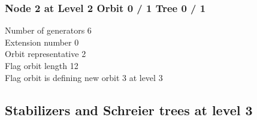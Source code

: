 \subsubsection*{Node 2 at Level 2 Orbit 0 / 1 Tree 0 / 1}
Number of generators 6\\

\noindent Extension number 0\\
Orbit representative 2\\
Flag orbit length 12\\
Flag orbit is defining new orbit 3 at level 3\\

\subsection{Stabilizers and Schreier trees at level 3}

